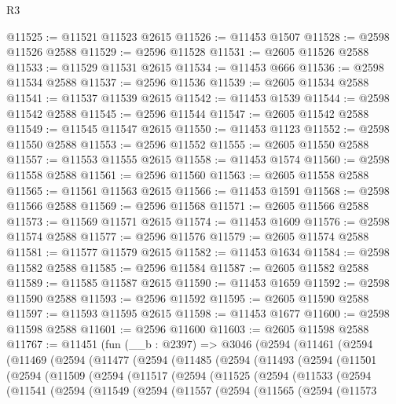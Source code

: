 \begin{lexlean}{R3}
\begin{coremodule}
@11525 := @11521 @11523 @2615
@11526 := @11453 @1507
@11528 := @2598 @11526 @2588
@11529 := @2596 @11528
@11531 := @2605 @11526 @2588
@11533 := @11529 @11531 @2615
@11534 := @11453 @666
@11536 := @2598 @11534 @2588
@11537 := @2596 @11536
@11539 := @2605 @11534 @2588
@11541 := @11537 @11539 @2615
@11542 := @11453 @1539
@11544 := @2598 @11542 @2588
@11545 := @2596 @11544
@11547 := @2605 @11542 @2588
@11549 := @11545 @11547 @2615
@11550 := @11453 @1123
@11552 := @2598 @11550 @2588
@11553 := @2596 @11552
@11555 := @2605 @11550 @2588
@11557 := @11553 @11555 @2615
@11558 := @11453 @1574
@11560 := @2598 @11558 @2588
@11561 := @2596 @11560
@11563 := @2605 @11558 @2588
@11565 := @11561 @11563 @2615
@11566 := @11453 @1591
@11568 := @2598 @11566 @2588
@11569 := @2596 @11568
@11571 := @2605 @11566 @2588
@11573 := @11569 @11571 @2615
@11574 := @11453 @1609
@11576 := @2598 @11574 @2588
@11577 := @2596 @11576
@11579 := @2605 @11574 @2588
@11581 := @11577 @11579 @2615
@11582 := @11453 @1634
@11584 := @2598 @11582 @2588
@11585 := @2596 @11584
@11587 := @2605 @11582 @2588
@11589 := @11585 @11587 @2615
@11590 := @11453 @1659
@11592 := @2598 @11590 @2588
@11593 := @2596 @11592
@11595 := @2605 @11590 @2588
@11597 := @11593 @11595 @2615
@11598 := @11453 @1677
@11600 := @2598 @11598 @2588
@11601 := @2596 @11600
@11603 := @2605 @11598 @2588
@11767 := @11451
    (fun (__b : @2397) =>
    @3046
      (@2594
        (@11461
          (@2594
            (@11469
              (@2594
                (@11477
                  (@2594
                    (@11485
                      (@2594
                        (@11493
                          (@2594
                            (@11501
                              (@2594
                                (@11509
                                  (@2594
                                    (@11517
                                      (@2594
                                        (@11525
                                          (@2594
                                            (@11533
                                              (@2594
                                                (@11541
                                                  (@2594
                                                    (@11549
                                                      (@2594
                                                        (@11557
                                                          (@2594
                                                            (@11565
                                                              (@2594
                                                                (@11573

\end{coremodule}
\end{lexlean}
